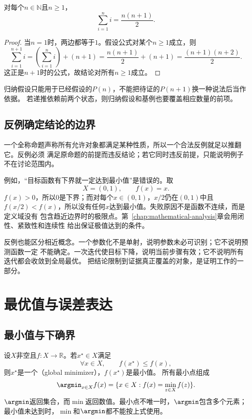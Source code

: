 \begin{theorem}[前$n$个正整数之和]
\label{thm:prelim-arithmetic-sum}
对每个$n\in\mathbb{N}$且$n\geq1$，
\[
  \sum_{i=1}^{n}i=\frac{n(n+1)}{2}.
\]
\end{theorem}

\begin{proof}
当$n=1$时，两边都等于$1$。假设公式对某个$n\geq1$成立，则
\[
  \sum_{i=1}^{n+1}i
  =
  \left(\sum_{i=1}^{n}i\right)+(n+1)
  =
  \frac{n(n+1)}{2}+(n+1)
  =
  \frac{(n+1)(n+2)}{2}.
\]
这正是$n+1$时的公式，故结论对所有$n\geq1$成立。
\end{proof}

归纳假设只能用于已经假设的$P(n)$，不能把待证的$P(n+1)$换一种说法后当作依据。
若递推依赖前两个状态，则归纳假设和基例也要覆盖相应数量的前项。

\subsection{反例确定结论的边界}

一个全称命题声称所有允许对象都满足某种性质，所以一个合法反例就足以推翻它。反例必须
满足原命题的前提而违反结论；若它同时违反前提，只能说明例子不在讨论范围内。

例如，“目标函数有下界就一定达到最小值”是错误的。取
\[
  X=(0,1),\qquad f(x)=x.
\]
$f(x)>0$，所以$0$是下界；而对每个$x\in(0,1)$，$x/2$仍在$(0,1)$中且
$f(x/2)<f(x)$，所以没有任何$x$达到最小值。失败原因不是函数不连续，而是定义域没有
包含趋近边界时的极限点。第~\ref{chap:mathematical-analysis}章会用闭性、紧致性和连续性
给出保证极值达到的条件。

反例也能区分相近概念。一个参数化不是单射，说明参数未必可识别；它不说明预测函数一定
不能确定。一次迭代使目标下降，说明当前步骤有效；它不说明所有迭代都会收敛到全局最优。
把结论限制到证据真正覆盖的对象，是证明工作的一部分。

\section{最优值与误差表达}
\label{sec:prelim-optimal-values-errors}

\subsection{最小值与下确界}

设$X$非空且$f:X\to\mathbb{R}$。若$x^\star\in X$满足
\[
  \forall x\in X,\qquad f(x^\star)\leq f(x),
\]
则$x^\star$是一个（global minimizer），$f(x^\star)$是最小值。
所有最小点组成
\[
  \argmin_{x\in X} f(x)
  =
  \{x\in X:f(x)=\min_{z\in X}f(z)\}.
\]
$\argmin$返回集合，而$\min$返回数值。最小点不唯一时，$\argmin$包含多个元素；
最小值未达到时，$\min$和$\argmin$都不能按上式使用。

